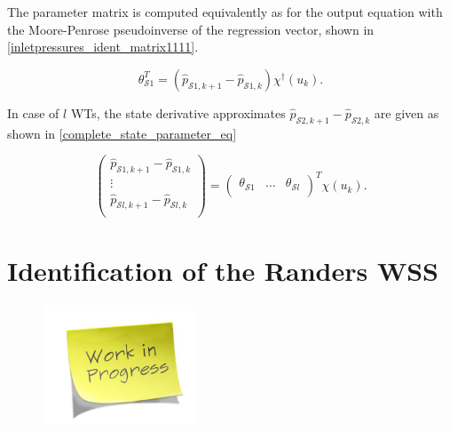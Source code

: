The parameter matrix is computed equivalently as for the output equation with the Moore-Penrose pseudoinverse of the regression vector, shown in \eqref{inletpressures_ident_matrix1111}.

  \begin{equation}
\label{inletpressures_ident_matrix1111}
 \theta^T_{\mathcal{S}1} = (\hat{p}_{\mathcal{S}1,k+1} - \hat{p}_{\mathcal{S}1,k})  \chi^{\dagger}(u_k). 
\end{equation}

In case of $l$ WTs, the state derivative approximates $\hat{p}_{\mathcal{S}2,k+1}\! -\! \hat{p}_{\mathcal{S}2,k}$ are given as shown in \eqref{complete_state_parameter_eq}

\begin{equation}
\label{complete_state_parameter_eq}
         \begin{pmatrix}
           \hat{p}_{\mathcal{S}1,k+1} - \hat{p}_{\mathcal{S}1,k} \\[1pt]
           \vdots\\[1pt]
           \hat{p}_{\mathcal{S}l,k+1} - \hat{p}_{\mathcal{S}l,k} \\[1pt]
         \end{pmatrix}
         =
          \begin{pmatrix}
           \theta_{\mathcal{S}1} & \! \hdots \! & \theta_{\mathcal{S}l} \\[1pt]
         \end{pmatrix}^T
\chi(u_k).
\end{equation}

\section{Identification of the Randers WSS}
\label{identification_of_the_randers_WSS} 

\begin{figure}[H]
\centering
\includegraphics[width=0.4\textwidth]{report/pictures/missingfigure}
\end{figure}

